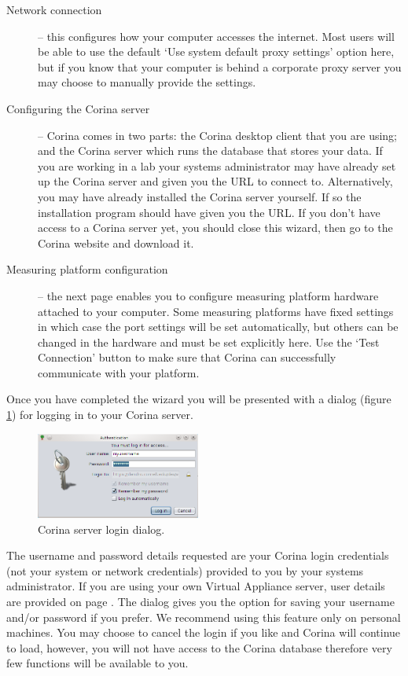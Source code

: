 \begin{description}
 \item[Network connection] -- this configures how your computer accesses the internet.  Most users will be able to use the default `Use system default proxy settings' option here, but if you know that your computer is behind a corporate proxy server you may choose to manually provide the settings.
 \item[Configuring the Corina server] -- Corina comes in two parts: the Corina desktop client that you are using; and the Corina server which runs the database that stores your data.  If you are working in a lab your systems administrator may have already set up the Corina server and given you the URL to connect to.  Alternatively, you may have already installed the Corina server yourself.  If so the installation program should have given you the URL. If you don't have access to a Corina server yet, you should close this wizard, then go to the Corina website and download it.
 \item[Measuring platform configuration] -- the next page enables you to configure measuring platform hardware attached to your computer.  Some measuring platforms have fixed settings in which case the port settings will be set automatically, but others can be changed in the hardware and must be set explicitly here. Use the `Test Connection' button to make sure that Corina can successfully communicate with your platform.
\end{description}


Once you have completed the wizard you will be presented with a dialog (figure \ref{fig:login}) for logging in to your Corina server.

\begin{figure}
  \begin{center}
    \includegraphics[width=0.48\textwidth]{Images/login.png}
  \end{center}
  \caption{Corina server login dialog.}
  \label{fig:login}
\end{figure}

The username and password details requested are your Corina login credentials (not your system or network credentials) provided to you by your systems administrator.  If you are using your own Virtual Appliance server, user details are provided on page \pageref{txt:virtualAppliance}.  The dialog gives you the option for saving your username and/or password if you prefer.  We recommend using this feature only on personal machines.  You may choose to cancel the login if you like and Corina will continue to load, however, you will not have access to the Corina database therefore very few functions will be available to you.

